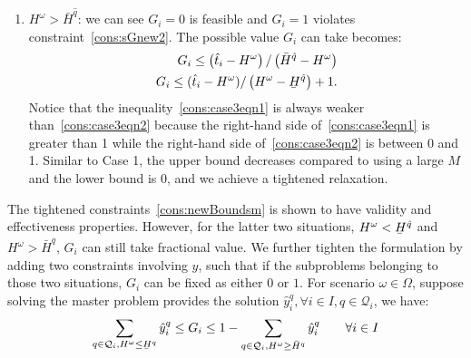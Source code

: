 \documentclass[11pt]{article}
\renewcommand{\underbar}{\underaccent{\bar}}
\begin{document}
\begin{enumerate}
		\item 
			\(H^\omega > \bar{H}^{\hat{q}}\): 
			we can see \(G_i = 0\) is feasible and \(G_i = 1\) violates constraint~\eqref{cons:sGnew2}. The possible value \(G_i\) can take becomes:
			\begin{subequations}
				\begin{align}
				G_i \leq \left(\hat{t}_i - H^\omega \right)/\left( \bar{H}^{\hat{q}} - H^\omega \right) \label{cons:case3eqn1}\\
				G_i \leq (\hat{t}_i - H^\omega)/\left(H^\omega - \underbar{H}^{\hat{q}} \right) + 1. \label{cons:case3eqn2}
				\end{align}
			\end{subequations}
			Notice that the inequality~\eqref{cons:case3eqn1} is always weaker than~\eqref{cons:case3eqn2} because the right-hand side of~\eqref{cons:case3eqn1} is greater than 1 while the right-hand side of~\eqref{cons:case3eqn2} is between 0 and 1. Similar to Case 1, the upper bound decreases compared to using a large \(M\) and the lower bound is \(0\), and we achieve a tightened relaxation.
	\end{enumerate}
	The tightened constraints~\eqref{cons:newBoundsm} is shown to have validity and effectiveness properties. However, for the latter two situations, 
	\(H^\omega < \underbar{H}^{\hat{q}}\) and \(H^\omega > \bar{H}^{\hat{q}}\), 
	\(G_i\) can still take fractional value. We further tighten the formulation by adding two constraints involving \(y\), such that if the subproblems belonging to those two situations, \(G_i\) can be fixed as either \(0\) or \(1\). For scenario \(\omega \in \Omega\), suppose solving the master problem provides the solution \(\hat{y}_i^q, \forall i \in I, q \in \mathcal{Q}_i\), we have:
		\begin{equation}\label{cons:subyG}
			\sum_{q \in \mathcal{Q}_i, H^\omega \leq \underbar{H}^q} \hat{y}_i^q \leq G_i \leq 1 - \sum_{q \in \mathcal{Q}_i, H^\omega \geq \bar{H}^q} \hat{y}_i^q \qquad \forall i \in I 
		\end{equation}
\end{document}
